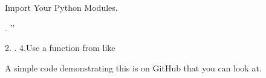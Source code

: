 \begin{tcolorbox}
  \begin{algorithm}[H]
  \label{alg:importPythonCode}
   \caption{Import Your Python Modules.}
. ''\code{)}

2.     .     \;
4.Use a function from  like \\
\end{algorithm}
\end{tcolorbox}
A simple code demonstrating this is on GitHub that you can look at.



